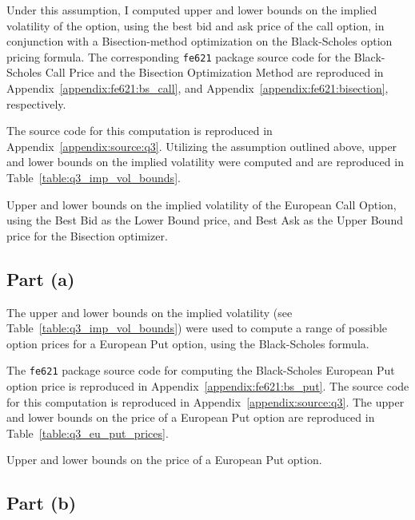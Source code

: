 \documentclass[10pt]{article}
\begin{document}
Under this assumption, I computed upper and lower bounds on the implied volatility of the option, using the best bid and ask price of the call option, in conjunction with a Bisection-method optimization on the Black-Scholes option pricing formula. The corresponding \texttt{fe621} package source code for the Black-Scholes Call Price and the Bisection Optimization Method are reproduced in Appendix~\ref{appendix:fe621:bs_call}, and Appendix~\ref{appendix:fe621:bisection}, respectively.

The source code for this computation is reproduced in Appendix~\ref{appendix:source:q3}. Utilizing the assumption outlined above, upper and lower bounds on the implied volatility were computed and are reproduced in Table~\ref{table:q3_imp_vol_bounds}.

\begin{table}[!h]
    \centering
    \caption{Upper and lower bounds on the implied volatility of the European Call Option, using the Best Bid as the Lower Bound price, and Best Ask as the Upper Bound price for the Bisection optimizer.}
    \label{table:q3_imp_vol_bounds}
\end{table}


\newpage
\subsection{Part (a)}

The upper and lower bounds on the implied volatility (see Table~\ref{table:q3_imp_vol_bounds}) were used to compute a range of possible option prices for a European Put option, using the Black-Scholes formula.

The \texttt{fe621} package source code for computing the Black-Scholes European Put option price is reproduced in Appendix~\ref{appendix:fe621:bs_put}. The source code for this computation is reproduced in Appendix~\ref{appendix:source:q3}. The upper and lower bounds on the price of a European Put option are reproduced in Table~\ref{table:q3_eu_put_prices}.

\begin{table}[!h]
    \centering
    \caption{Upper and lower bounds on the price of a European Put option.}
    \label{table:q3_eu_put_prices}
\end{table}


\subsection{Part (b)}
\end{document}
